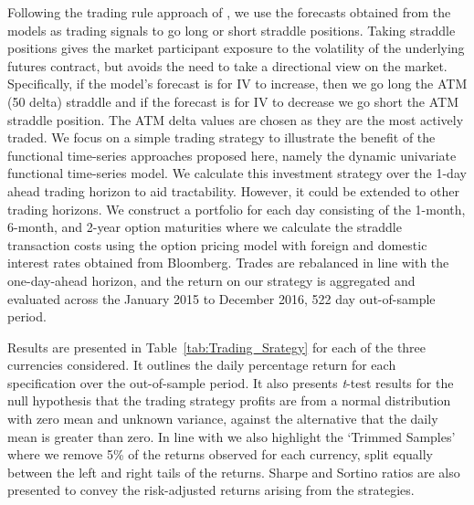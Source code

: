 \documentclass[12pt,a4paper]{article}
\begin{document}
Following the trading rule approach of \cite{BG14}, we use the forecasts obtained from the models as trading signals to go long or short straddle positions. Taking straddle positions gives the market participant exposure to the volatility of the underlying futures contract, but avoids the need to take a directional view on the market. Specifically, if the model's forecast is for IV to increase, then we go long the ATM (50 delta) straddle and if the forecast is for IV to decrease we go short the ATM straddle position. The ATM delta values are chosen as they are the most actively traded. We focus on a simple trading strategy to illustrate the benefit of the functional time-series approaches proposed here, namely the dynamic univariate functional time-series model. We calculate this investment strategy over the 1-day ahead trading horizon to aid tractability. However, it could be extended to other trading horizons. We construct a portfolio for each day consisting of the 1-month, 6-month, and 2-year option maturities where we calculate the straddle transaction costs using the \cite{GK83} option pricing model with foreign and domestic interest rates obtained from Bloomberg. Trades are rebalanced in line with the one-day-ahead horizon, and the return on our strategy is aggregated and evaluated across the January 2015 to December 2016, 522 day out-of-sample period.

Results are presented in Table~\ref{tab:Trading_Srategy} for each of the three currencies considered. It outlines the daily percentage return for each specification over the out-of-sample period. It also presents \textit{t}-test results for the null hypothesis that the trading strategy profits are from a normal distribution with zero mean and unknown variance, against the alternative that the daily mean is greater than zero. In line with \cite{KCM18} we also highlight the `Trimmed Samples' where we remove 5\% of the returns observed for each currency, split equally between the left and right tails of the returns. Sharpe and Sortino ratios are also presented to convey the risk-adjusted returns arising from the strategies.
\end{document}
